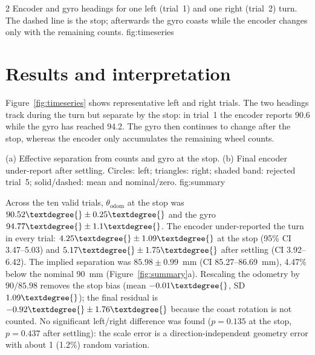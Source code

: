 \documentclass[a4paper,10pt]{article}
\begin{document}
\begin{multicols*}{2}
  {Encoder and gyro headings for one left (trial~1) and one right
   (trial~2) turn. The dashed line is the stop; afterwards the gyro coasts
   while the encoder changes only with the remaining counts.}
  {fig:timeseries}

\columnbreak

\section*{Results and interpretation}
Figure~\ref{fig:timeseries} shows representative left and right trials. The
two headings track during the turn but separate by the stop: in trial~1 the
encoder reports 90.6\textdegree{} while the gyro has reached
94.2\textdegree{}. The gyro then continues to change after the stop, whereas
the encoder only accumulates the remaining wheel counts.

  {(a) Effective separation from counts and gyro at the stop. (b) Final
   encoder under-report after settling. Circles: left; triangles: right;
   shaded band: rejected trial~5; solid/dashed: mean and nominal/zero.}
  {fig:summary}

Across the ten valid trials, $\theta_{\mathrm{odom}}$ at the stop was
$90.52\textdegree{}\pm0.25\textdegree{}$ and the gyro
$94.77\textdegree{}\pm1.1\textdegree{}$. The encoder under-reported the turn
in every trial: $4.25\textdegree{}\pm1.09\textdegree{}$ at the stop (95\% CI
3.47--5.03\textdegree{}) and $5.17\textdegree{}\pm1.75\textdegree{}$ after
settling (CI 3.92--6.42\textdegree{}). The implied separation was
$85.98\pm0.99$~mm (CI 85.27--86.69~mm), 4.47\% below the nominal 90~mm
(Figure~\ref{fig:summary}a). Rescaling the odometry by $90/85.98$ removes the
stop bias (mean $-0.01\textdegree{}$, SD $1.09\textdegree{}$); the final
residual is $-0.92\textdegree{}\pm1.76\textdegree{}$ because the coast
rotation is not counted. No significant left/right difference was found ($p=0.135$ at the stop,
$p=0.437$ after settling): the scale error is a direction-independent
geometry error with about 1\textdegree{} (1.2\%) random variation.


\end{multicols*}
\end{document}
